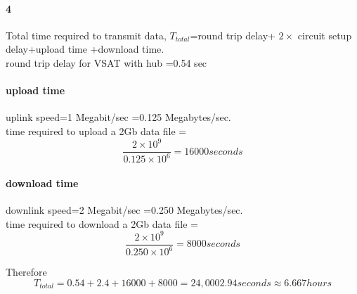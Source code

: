 \documentclass[24 pts]{article}
\begin{document}
\paragraph{4}
Total time required to transmit data, $T_{total}$=round trip delay+ $2\times$ circuit setup delay+upload time +download time.\\
round trip delay for VSAT with hub =0.54 sec
\paragraph{upload time}
uplink speed=1 Megabit/sec =0.125 Megabytes/sec.\\
time required to upload a 2Gb data file =$$\frac{2\times 10^9} {0.125\times 10^6}=16000 seconds$$

\paragraph{download time}
downlink speed=2 Megabit/sec =0.250 Megabytes/sec.\\
time required to download a 2Gb data file =$$\frac{2\times 10^9} {0.250\times 10^6}=8000 seconds$$

Therefore  $$T_{total}=0.54+2.4+16000+8000=24,0002.94 seconds\approx 6.667 hours$$
\end{document}
